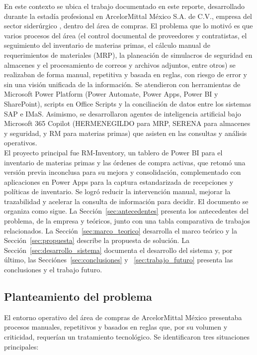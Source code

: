 En este contexto se ubica el trabajo documentado en este reporte, desarrollado durante la estadía profesional en ArcelorMittal México S.A. de C.V., empresa del sector siderúrgico \cite{arcelormittal2026mexico}, dentro del área de compras. El problema que lo motivó es que varios procesos del área (el control documental de proveedores y contratistas, el seguimiento del inventario de materias primas, el cálculo manual de requerimientos de materiales (MRP), la planeación de simulacros de seguridad en almacenes y el procesamiento de correos y archivos adjuntos, entre otros) se realizaban de forma manual, repetitiva y basada en reglas, con riesgo de error y sin una visión unificada de la información. Se atendieron con herramientas de Microsoft Power Platform (Power Automate, Power Apps, Power BI y SharePoint), scripts en Office Scripts y la conciliación de datos entre los sistemas SAP e IMaS. Asimismo, se desarrollaron agentes de inteligencia artificial bajo Microsoft 365 Copilot (HERMENEGILDO para MRP, SERENA para almacenes y seguridad, y RM para materias primas) que asisten en las consultas y análisis operativos. \\ El proyecto principal fue RM-Inventory, un tablero de Power BI para el inventario de materias primas y las órdenes de compra activas, que retomó una versión previa inconclusa para su mejora y consolidación, complementado con aplicaciones en Power Apps para la captura estandarizada de recepciones y políticas de inventario. Se logró reducir la intervención manual, mejorar la trazabilidad y acelerar la consulta de información para decidir.
El documento se organiza como sigue. La Sección~\ref{sec:antecedentes} presenta los antecedentes del problema, de la empresa y teóricos, junto con una tabla comparativa de trabajos relacionados. La Sección~\ref{sec:marco_teorico} desarrolla el marco teórico y la Sección~\ref{sec:propuesta} describe la propuesta de solución. La Sección~\ref{sec:desarrollo_sistema} documenta el desarrollo del sistema y, por último, las Secciónes~\ref{sec:conclusiones} y ~\ref{sec:trabajo_futuro} presenta las conclusiones y el trabajo futuro.

\subsection{Planteamiento del problema} \label{sec:problema} %

El entorno operativo del área de compras de ArcelorMittal México presentaba procesos manuales, repetitivos y basados en reglas que, por su volumen y criticidad, requerían un tratamiento tecnológico. Se identificaron tres situaciones principales:
 
